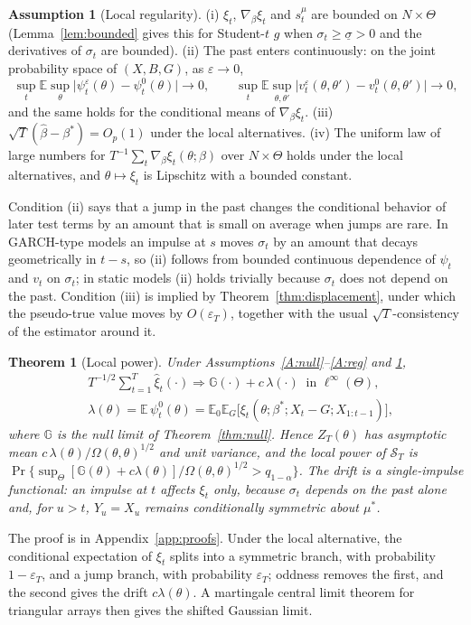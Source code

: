 \documentclass[11pt,a4paper]{article}
\newtheorem{theorem}{Theorem}
\theoremstyle{definition}
\newtheorem{assumption}{Assumption}
\theoremstyle{remark}
\newcommand{\E}{\mathbb{E}}
\begin{document}
\begin{assumption}[Local regularity]\label{A:local}
(i) $\xi_t$, $\nabla_\beta\xi_t$ and $s^\mu_t$ are bounded on $N\times\Theta$ (Lemma~\ref{lem:bounded} gives this for Student-$t$ $g$ when $\sigma_t\ge\underline\sigma>0$ and the derivatives of $\sigma_t$ are bounded). (ii) The past enters continuously: on the joint probability space of $(X,B,G)$, as $\varepsilon\to0$,
\[
\sup_t\E\sup_{\theta}\big|\psi^{\varepsilon}_t(\theta)-\psi^0_t(\theta)\big|\to0,\qquad
\sup_t\E\sup_{\theta,\theta'}\big|v^{\varepsilon}_t(\theta,\theta')-v^0_t(\theta,\theta')\big|\to0,
\]
and the same holds for the conditional means of $\nabla_\beta\xi_t$. (iii) $\sqrt T(\hat\beta-\beta^*)=O_p(1)$ under the local alternatives. (iv) The uniform law of large numbers for $T^{-1}\sum_t\nabla_\beta\xi_t(\theta;\beta)$ over $N\times\Theta$ holds under the local alternatives, and $\theta\mapsto\xi_t$ is Lipschitz with a bounded constant.
\end{assumption}
\noindent Condition (ii) says that a jump in the past changes the conditional behavior of later test terms by an amount that is small on average when jumps are rare. In GARCH-type models an impulse at $s$ moves $\sigma_t$ by an amount that decays geometrically in $t-s$, so (ii) follows from bounded continuous dependence of $\psi_t$ and $v_t$ on $\sigma_t$; in static models (ii) holds trivially because $\sigma_t$ does not depend on the past. Condition (iii) is implied by Theorem~\ref{thm:displacement}, under which the pseudo-true value moves by $O(\varepsilon_T)$, together with the usual $\sqrt T$-consistency of the estimator around it.

\begin{theorem}[Local power]\label{thm:local}
Under Assumptions~\ref{A:null}--\ref{A:reg} and \ref{A:local},
\[
\begin{aligned}
&T^{-1/2}\sum_{t=1}^T\hat\xi_t(\cdot)\Rightarrow\mathbb G(\cdot)+c\,\lambda(\cdot)\ \text{ in }\ell^\infty(\Theta),\\
&\lambda(\theta)=\E\,\psi^0_t(\theta)=\E_0\E_G\big[\xi_t(\theta;\beta^*;X_t-G;X_{1:t-1})\big],
\end{aligned}
\]
where $\mathbb G$ is the null limit of Theorem~\ref{thm:null}. Hence $Z_T(\theta)$ has asymptotic mean $c\,\lambda(\theta)/\Omega(\theta,\theta)^{1/2}$ and unit variance, and the local power of $\mathcal S_T$ is $\Pr\{\sup_\Theta[\mathbb G(\theta)+c\lambda(\theta)]/\Omega(\theta,\theta)^{1/2}>q_{1-\alpha}\}$. The drift is a single-impulse functional: an impulse at $t$ affects $\xi_t$ only, because $\sigma_t$ depends on the past alone and, for $u>t$, $Y_u=X_u$ remains conditionally symmetric about $\mu^*$.
\end{theorem}
\noindent The proof is in Appendix~\ref{app:proofs}. Under the local alternative, the conditional expectation of $\xi_t$ splits into a symmetric branch, with probability $1-\varepsilon_T$, and a jump branch, with probability $\varepsilon_T$; oddness removes the first, and the second gives the drift $c\lambda(\theta)$. A martingale central limit theorem for triangular arrays then gives the shifted Gaussian limit.
\end{document}
